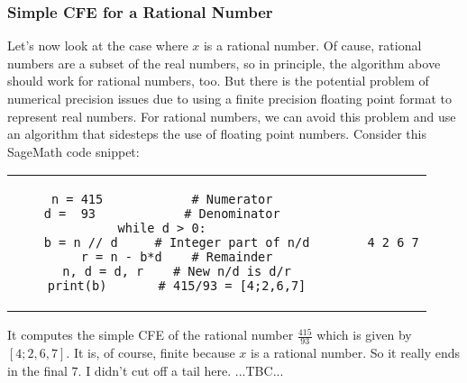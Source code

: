

\subsubsection{Simple CFE for a Rational Number}
Let's now look at the case where $x$ is a rational number. Of cause, rational numbers are a subset of the real numbers, so in principle, the algorithm above should work for rational numbers, too. But there is the potential problem of numerical precision issues due to using a finite precision floating point format to represent real numbers. For rational numbers, we can avoid this problem and use an algorithm that sidesteps the use of floating point numbers. Consider this SageMath code snippet:
\begin{center}
\begin{tabular}{ ccccc } 
\begin{lstlisting}
n = 415            # Numerator
d =  93            # Denominator
while d > 0:
    b = n // d     # Integer part of n/d
    r = n - b*d    # Remainder
    n, d = d, r    # New n/d is d/r
    print(b)       # 415/93 = [4;2,6,7]
\end{lstlisting}
& & \vline & &
\begin{lstlisting}
4 2 6 7
\end{lstlisting}
\end{tabular}
\end{center}
It computes the simple CFE of the rational number $\frac{415}{93}$ which is given by $[4;2,6,7]$. It is, of course, finite because $x$ is a rational number. So it really ends in the final $7$. I didn't cut off a tail here. ...TBC...


